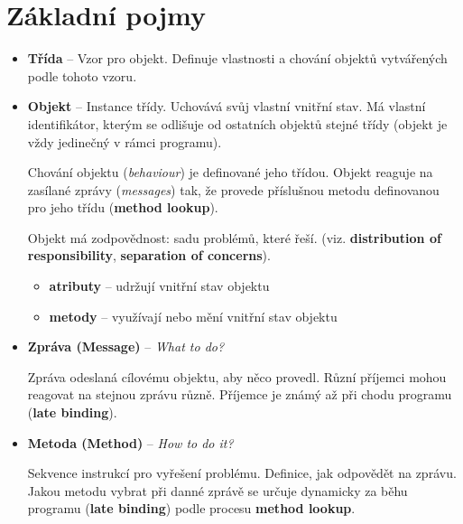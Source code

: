 \documentclass{szzclass}
\begin{document}
\maketitle

\tableofcontents
\newpage

\section{Základní pojmy}

\begin{itemize}
      \item \textbf{Třída} -- Vzor pro objekt. Definuje vlastnosti a chování objektů vytvářených podle tohoto vzoru.
      \item \textbf{Objekt} -- Instance třídy. Uchovává svůj vlastní vnitřní stav. Má vlastní identifikátor,
      kterým se odlišuje od ostatních objektů stejné třídy (objekt je vždy jedinečný v rámci programu).

      Chování objektu (\textit{behaviour}) je definované jeho třídou. Objekt reaguje na zasílané zprávy
      (\textit{messages}) tak, že provede příslušnou metodu definovanou pro jeho třídu (\textbf{method lookup}).

      Objekt má zodpovědnost: sadu problémů, které řeší. (viz. \textbf{distribution of responsibility}, \textbf{separation of concerns}).

      \begin{itemize}
            \item \textbf{atributy} -- udržují vnitřní stav objektu
            \item \textbf{metody} -- využívají nebo mění vnitřní stav objektu
      \end{itemize}

      \item \textbf{Zpráva (Message)} -- \textit{What to do?}

      Zpráva odeslaná cílovému objektu, aby něco provedl. Různí příjemci mohou reagovat na stejnou zprávu různě.
      Příjemce je známý až při chodu programu (\textbf{late binding}).

      \item \textbf{Metoda (Method)} -- \textit{How to do it?}

      Sekvence instrukcí pro vyřešení problému. Definice, jak odpovědět na zprávu.
      Jakou metodu vybrat při danné zprávě se určuje dynamicky za běhu programu (\textbf{late binding}) podle procesu \textbf{method lookup}.

\end{itemize}
\end{document}
